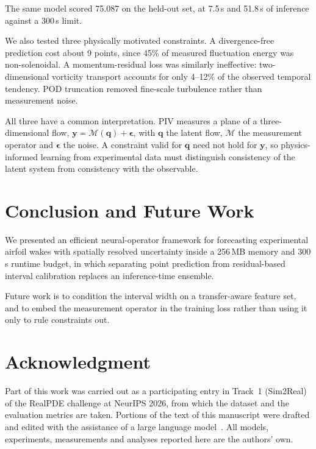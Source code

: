 \documentclass[conference,10pt]{IEEEtran}
\begin{document}
The same model scored 75.087 on the held-out set, at 7.5\,s and 51.8\,s of inference against a 300\,s limit.

We also tested three physically motivated constraints. A divergence-free prediction cost about 9 points, since 45\% of measured fluctuation energy was non-solenoidal. A momentum-residual loss was similarly ineffective: two-dimensional vorticity transport accounts for only 4--12\% of the observed temporal tendency. POD truncation removed fine-scale turbulence rather than measurement noise.

All three have a common interpretation. PIV measures a plane of a three-dimensional flow, $\mathbf{y}=\mathcal{M}(\mathbf{q})+\boldsymbol{\epsilon}$, with $\mathbf{q}$ the latent flow, $\mathcal{M}$ the measurement operator and $\boldsymbol{\epsilon}$ the noise. A constraint valid for $\mathbf{q}$ need not hold for $\mathbf{y}$, so physics-informed learning from experimental data must distinguish consistency of the latent system from consistency with the observable.

\section{Conclusion and Future Work}
We presented an efficient neural-operator framework for forecasting experimental airfoil wakes with spatially resolved uncertainty inside a 256\,MB memory and 300\,s runtime budget, in which separating point prediction from residual-based interval calibration replaces an inference-time ensemble.

Future work is to condition the interval width on a transfer-aware feature set, and to embed the measurement operator in the training loss rather than using it only to rule constraints out.

\section*{Acknowledgment}
Part of this work was carried out as a participating entry in Track~1 (Sim2Real) of the RealPDE challenge at NeurIPS 2026, from which the dataset and the evaluation metrics are taken. Portions of the text of this manuscript were drafted and edited with the assistance of a large language model~\cite{claude}. All models, experiments, measurements and analyses reported here are the authors' own.
\end{document}
